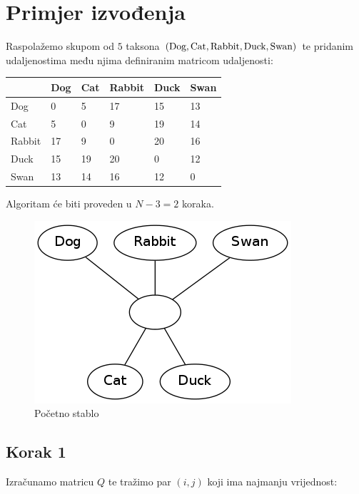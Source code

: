 \documentclass[times, utf8, seminar, numeric]{fer}
\begin{document}
\chapter{Primjer izvođenja}

Raspolažemo skupom od $5$ taksona $(\textup{Dog},\textup{Cat},\textup{Rabbit},\textup{Duck},\textup{Swan})$ te pridanim udaljenostima među njima definiranim matricom udaljenosti:
\begin{table}[h]
	\centering
    \begin{tabular}{|l|l|l|l|l|l|}
    \hline
    ~ & Dog  & Cat  & Rabbit  & Duck  & Swan  \\ \hline
    Dog & 0  & 5  & 17 & 15 & 13 \\ \hline
    Cat & 5  & 0  & 9  & 19 & 14 \\ \hline
    Rabbit & 17 & 9  & 0  & 20 & 16 \\ \hline
    Duck & 15 & 19 & 20 & 0  & 12 \\ \hline
    Swan & 13 & 14 & 16 & 12 & 0  \\ \hline
    \end{tabular}
\end{table}

Algoritam će biti proveden u $N-3=2$ koraka. \newline

\begin{figure}[htb]
\centering
\includegraphics[scale=0.6]{./img/pocetni.png}
\caption{Početno stablo}
\end{figure}

\newpage
\section{Korak 1}
Izračunamo matricu $Q$ te tražimo par $(i,j)$ koji ima najmanju vrijednost:
\end{document}
